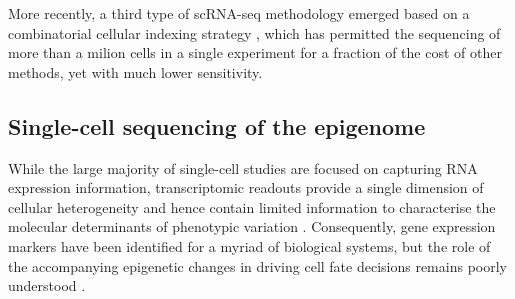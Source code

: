 More recently, a third type of scRNA-seq methodology emerged based on a combinatorial cellular indexing strategy \cite{Cao2017,Rosenberg2018,Cao2019}, which has permitted the sequencing of more than a milion cells in a single experiment for a fraction of the cost of other methods, yet with much lower sensitivity.

\subsection{Single-cell sequencing of the epigenome}

While the large majority of single-cell studies are focused on capturing RNA expression information, transcriptomic readouts provide a single dimension of cellular heterogeneity and hence contain limited information to characterise the molecular determinants of phenotypic variation \cite{Ritchie2015}. Consequently, gene expression markers have been identified for a myriad of biological systems, but the role of the accompanying epigenetic changes in driving cell fate decisions remains poorly understood \cite{Griffiths2018,Kelsey2017,Bheda2014}.

